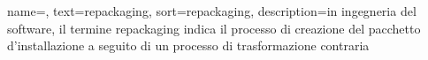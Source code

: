 




{
name=,
text=repackaging,
sort=repackaging,
description={in ingegneria del software, il termine repackaging indica il processo di creazione del pacchetto d'installazione a seguito di un processo di trasformazione contraria}
}

